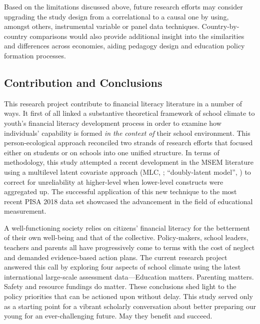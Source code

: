 Based on the limitations discussed above, future research efforts may consider upgrading the study design from a correlational to a causal one by using, amongst others, instrumental variable \citep{pokropek:2016} or panel data \citep{salasvelasco:2019} techniques. Country-by-country comparisons would also provide additional insight into the similarities and differences across economies, aiding pedagogy design and education policy formation processes.

\subsection{Contribution and Conclusions}

This research project contribute to financial literacy literature in a number of ways. It first of all linked a substantive theoretical framework of school climate to youth's financial literacy development process in order to examine how individuals' capability is formed \emph{in the context of} their school environment. This person-ecological approach reconciled two strands of research efforts that focused either on students or on schools into one unified structure. In terms of methodology, this study attempted a recent development in the MSEM literature using a multilevel latent covariate approach (MLC, \citet{ludtke:2008}; ``doubly-latent model'', \citet{marsh:2009}) to correct for unreliability at higher-level when lower-level constructs were aggregated up. The successful application of this new technique to the most recent PISA 2018 data set showcased the advancement in the field of educational measurement.

A well-functioning society relies on citizens' financial literacy for the betterment of their own well-being and that of the collective. Policy-makers, school leaders, teachers and parents all have progressively come to terms with the cost of neglect and demanded evidence-based action plans. The current research project answered this call by exploring four aspects of school climate using the latest international large-scale assessment data---Education matters. Parenting matters. Safety and resource fundings do matter. These conclusions shed light to the policy priorities that can be actioned upon without delay. This study served only as a starting point for a vibrant scholarly conversation about better preparing our young for an ever-challenging future. May they benefit and succeed.
